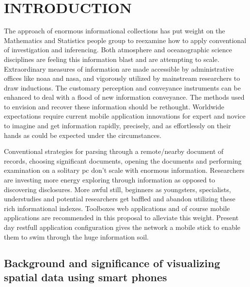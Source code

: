 \chapter{INTRODUCTION}
\label{chap:intro}


The approach of enormous informational collections has put weight on the Mathematics and Statistics people group to reexamine how to apply conventional of investigation and inferencing. Both atmosphere and oceanographic science disciplines are feeling this information blast and are attempting to scale. Extraordinary measures of information are made accessible by administrative offices like \gls{noaa} and \gls{nasa}, and vigorously utilized by mainstream researchers to draw inductions. The customary perception and conveyance instruments can be enhanced to deal with a flood of new information conveyance. The methods used to envision and recover these information should be rethought. Worldwide expectations require current mobile application innovations for expert and novice to imagine and get information rapidly, precisely, and as effortlessly on their hands as could be expected under the circumstances.

Conventional strategies for parsing through a remote/nearby document of records, choosing significant documents, opening the documents and performing examination on a solitary \gls{pc} don't scale with enormous information. Researchers are investing more energy exploring through information as opposed to discovering disclosures. More awful still, beginners as youngsters, specialists, understudies and potential researchers get baffled and abandon utilizing these rich informational indexes. Toolboxes web applications and of course mobile applications are recommended in this proposal to alleviate this weight. Present day \gls{restfull} application configuration gives the network a mobile stick to enable them to swim through the huge information soil.


\section{Background and significance of visualizing spatial data using smart phones}

